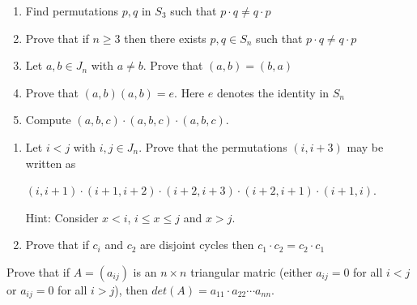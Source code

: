 \documentclass[12pt,letterpaper,cm]{hmcpset}
\begin{document}

\begin{problem}[A1]
    \begin{enumerate}
        \item Find permutations $p,q$ in $S_3$ such that $p\cdot q \neq q\cdot p$
        \item Prove that if $n\geq 3$ then there exists $p,q \in S_n$ such that $p\cdot q \neq q\cdot p$
        \item Let $a,b\in J_n$ with $a\neq b$. Prove that $(a,b) = (b,a)$
        \item Prove that $(a,b)(a,b) = e$. Here $e$ denotes the identity in $S_n$
        \item Compute $(a,b,c)\cdot(a,b,c)\cdot(a,b,c)$.
    \end{enumerate}
 \end{problem}

\begin{solution}
    
\end{solution}

\pagebreak

\begin{problem}[A2]
    \begin{enumerate}
        \item Let $i<j$ with $i,j\in J_n$. Prove that the permutations $(i,i+3)$ may be written as
        \begin{center}
            $(i,i+1)\cdot(i+1,i+2)\cdot(i+2,i+3)\cdot(i+2,i+1)\cdot(i+1,i)$.\\
        \end{center}
        Hint: Consider $x<i$, $i\leq x \leq j$ and $x>j$.
        \item Prove that if $c_i$ and $c_2$ are disjoint cycles then $c_1\cdot c_2 = c_2 \cdot c_1$
    \end{enumerate}
\end{problem}

\begin{solution}

\end{solution}

\pagebreak

\begin{problem}[A3]
    Prove that if $A=(a_{ij})$ is an $n \times n$ triangular matric (either $a_{ij} = 0$ for all $i<j$ or $a_{ij}=0$ for all $i>j$), then $det(A) = a_{11}\cdot a_{22} \cdots a_{nn}$.
\end{problem}
\end{document}
